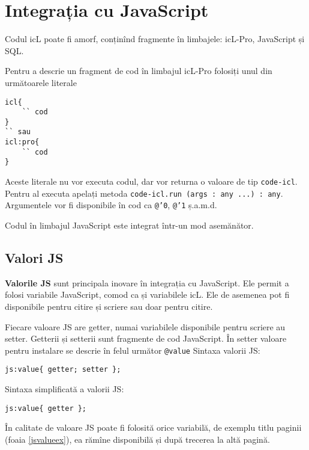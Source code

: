 \section{Integrația cu JavaScript}

Codul icL poate fi amorf, conținînd fragmente în limbajele: icL-Pro, JavaScript și SQL.

Pentru a descrie un fragment de cod în limbajul icL-Pro folosiți unul din următoarele literale 
\begin{verbatim}
icl{
	`` cod
}
`` sau
icl:pro{
	`` cod
}
\end{verbatim}

Aceste literale nu vor executa codul, dar vor returna o valoare de tip \texttt{code-icl}. Pentru al executa apelați metoda \texttt{code-icl.run (args : any ...) : any}. Argumentele vor fi disponibile în cod ca \texttt{@'0}, \texttt{@'1} ș.a.m.d.

Codul în limbajul JavaScript este integrat într-un mod asemănător.

\subsection{Valori JS}

{\bf Valorile JS} sunt principala inovare în integrația cu JavaScript. Ele permit a folosi variabile JavaScript, comod ca și variabilele icL. Ele de asemenea pot fi disponibile pentru citire și scriere sau doar pentru citire.

Fiecare valoare JS are getter, numai variabilele disponibile pentru scriere au setter. Getterii și setterii sunt fragmente de cod JavaScript. În setter valoare pentru instalare se descrie în felul următor \texttt{@{value}} Sintaxa valorii JS:
\begin{verbatim}
js:value{ getter; setter };
\end{verbatim}

Sintaxa simplificată a valorii JS:
\begin{verbatim}
js:value{ getter };
\end{verbatim}

În calitate de valoare JS poate fi folosită orice variabilă, de exemplu titlu paginii (foaia \ref{jsvalueex}), ea rămîne disponibilă și după trecerea la altă pagină.

\begin{sourcecode}
    \label{jsvalueex}
    \inputminted[linenos]{icl}{../sources/jsvalueex.icL}
\end{sourcecode}

